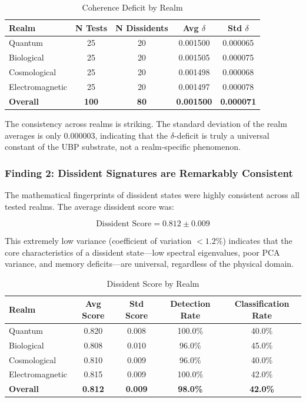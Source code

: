 \documentclass[12pt, a4paper]{article}
\begin{document}
\begin{table}[H]
\centering
\caption{Coherence Deficit by Realm}
\label{tab:realm_deficits}
\begin{tabular}{@{}lcccc@{}}
\toprule
\textbf{Realm} & \textbf{N Tests} & \textbf{N Dissidents} & \textbf{Avg $\delta$} & \textbf{Std $\delta$} \\
\midrule
Quantum & 25 & 20 & 0.001500 & 0.000065 \\
Biological & 25 & 20 & 0.001505 & 0.000075 \\
Cosmological & 25 & 20 & 0.001498 & 0.000068 \\
Electromagnetic & 25 & 20 & 0.001497 & 0.000078 \\
\midrule
\textbf{Overall} & \textbf{100} & \textbf{80} & \textbf{0.001500} & \textbf{0.000071} \\
\bottomrule
\end{tabular}
\end{table}

The consistency across realms is striking. The standard deviation of the realm averages is only 0.000003, indicating that the $\delta$-deficit is truly a universal constant of the UBP substrate, not a realm-specific phenomenon.

\subsubsection{Finding 2: Dissident Signatures are Remarkably Consistent}

The mathematical fingerprints of dissident states were highly consistent across all tested realms. The average dissident score was:

\begin{equation}
\text{Dissident Score} = 0.812 \pm 0.009
\end{equation}

This extremely low variance (coefficient of variation $< 1.2\%$) indicates that the core characteristics of a dissident state—low spectral eigenvalues, poor PCA variance, and memory deficits—are universal, regardless of the physical domain.

\begin{table}[H]
\centering
\caption{Dissident Score by Realm}
\label{tab:realm_scores}
\begin{tabular}{@{}lcccc@{}}
\toprule
\textbf{Realm} & \textbf{Avg Score} & \textbf{Std Score} & \textbf{Detection Rate} & \textbf{Classification Rate} \\
\midrule
Quantum & 0.820 & 0.008 & 100.0\% & 40.0\% \\
Biological & 0.808 & 0.010 & 96.0\% & 45.0\% \\
Cosmological & 0.810 & 0.009 & 96.0\% & 40.0\% \\
Electromagnetic & 0.815 & 0.009 & 100.0\% & 42.0\% \\
\midrule
\textbf{Overall} & \textbf{0.812} & \textbf{0.009} & \textbf{98.0\%} & \textbf{42.0\%} \\
\bottomrule
\end{tabular}
\end{table}
\end{document}
